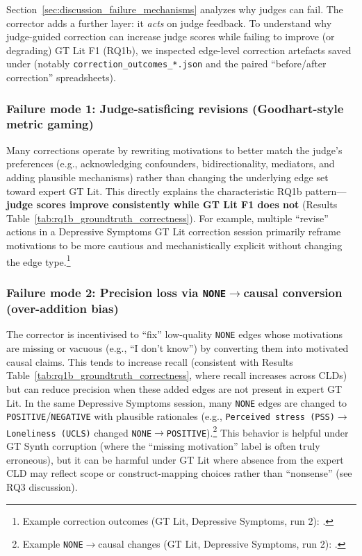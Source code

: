 Section~\ref{sec:discussion_failure_mechanisms} analyzes why judges can fail. The corrector adds a further layer: it \emph{acts} on judge feedback. To understand why judge-guided correction can increase judge scores while failing to improve (or degrading) GT Lit F1 (RQ1b), we inspected edge-level correction artefacts saved under \texttt{} (notably \texttt{correction\_outcomes\_*.json} and the paired ``before/after correction'' spreadsheets).

\subsubsection{Failure mode 1: Judge-satisficing revisions (Goodhart-style metric gaming)}
Many corrections operate by rewriting motivations to better match the judge's preferences (e.g., acknowledging confounders, bidirectionality, mediators, and adding plausible mechanisms) rather than changing the underlying edge set toward expert GT Lit. This directly explains the characteristic RQ1b pattern---\textbf{judge scores improve consistently while GT Lit F1 does not} (Results Table~\ref{tab:rq1b_groundtruth_correctness}). For example, multiple ``revise'' actions in a Depressive Symptoms GT Lit correction session primarily reframe motivations to be more cautious and mechanistically explicit without changing the edge type.\footnote{Example correction outcomes (GT Lit, Depressive Symptoms, run 2): .}

\subsubsection{Failure mode 2: Precision loss via \texttt{NONE}$\rightarrow$causal conversion (over-addition bias)}
The corrector is incentivised to ``fix'' low-quality \texttt{NONE} edges whose motivations are missing or vacuous (e.g., ``I don't know'') by converting them into motivated causal claims. This tends to increase recall (consistent with Results Table~\ref{tab:rq1b_groundtruth_correctness}, where recall increases across CLDs) but can reduce precision when these added edges are not present in expert GT Lit. In the same Depressive Symptoms session, many \texttt{NONE} edges are changed to \texttt{POSITIVE}/\texttt{NEGATIVE} with plausible rationales (e.g., \texttt{Perceived stress (PSS)}$\rightarrow$\texttt{Loneliness (UCLS)} changed \texttt{NONE}$\rightarrow$\texttt{POSITIVE}).\footnote{Example \texttt{NONE}$\rightarrow$causal changes (GT Lit, Depressive Symptoms, run 2): .}%
This behavior is helpful under GT Synth corruption (where the ``missing motivation'' label is often truly erroneous), but it can be harmful under GT Lit where absence from the expert CLD may reflect scope or construct-mapping choices rather than ``nonsense'' (see RQ3 discussion).

